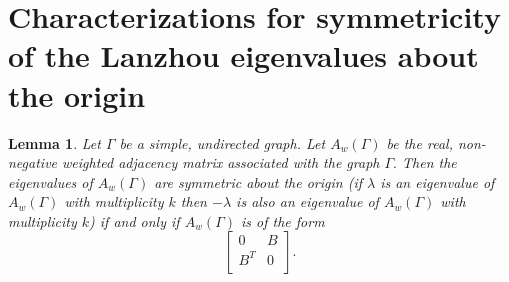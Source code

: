 \documentclass[10pt,a4paper,oneside]{article}
\newtheorem{lemma}[theorem]{Lemma}
\begin{document}
\section{Characterizations for symmetricity of the Lanzhou eigenvalues about the origin}

\begin{lemma}\label{ddd}
Let $\Gamma$ be a simple, undirected graph. Let $A_w(\Gamma)$ be the real, non-negative weighted adjacency matrix associated with the graph $\Gamma.$ Then the eigenvalues of $A_w(\Gamma)$ are symmetric about the origin (if $\lambda$ is an eigenvalue of $A_w(\Gamma)$ with multiplicity $k$ then $-\lambda$ is also an eigenvalue of $A_w(\Gamma)$ with multiplicity $k$) if and only if $A_w(\Gamma)$ is of the form  $$\begin{bmatrix}
0 & B\\
B^T & 0\\
\end{bmatrix}.$$
\end{lemma}
\end{document}
